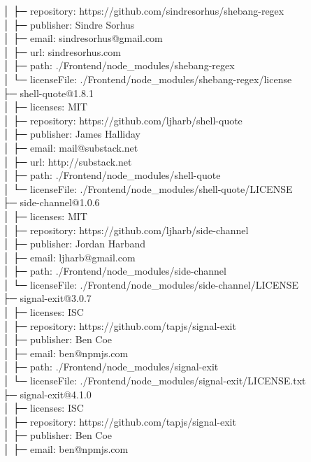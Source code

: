 │  ├─ repository: https://github.com/sindresorhus/shebang-regex\\
│  ├─ publisher: Sindre Sorhus\\
│  ├─ email: sindresorhus@gmail.com\\
│  ├─ url: sindresorhus.com\\
│  ├─ path: ./Frontend/node\_modules/shebang-regex\\
│  └─ licenseFile: ./Frontend/node\_modules/shebang-regex/license\\
├─ shell-quote@1.8.1\\
│  ├─ licenses: MIT\\
│  ├─ repository: https://github.com/ljharb/shell-quote\\
│  ├─ publisher: James Halliday\\
│  ├─ email: mail@substack.net\\
│  ├─ url: http://substack.net\\
│  ├─ path: ./Frontend/node\_modules/shell-quote\\
│  └─ licenseFile: ./Frontend/node\_modules/shell-quote/LICENSE\\
├─ side-channel@1.0.6\\
│  ├─ licenses: MIT\\
│  ├─ repository: https://github.com/ljharb/side-channel\\
│  ├─ publisher: Jordan Harband\\
│  ├─ email: ljharb@gmail.com\\
│  ├─ path: ./Frontend/node\_modules/side-channel\\
│  └─ licenseFile: ./Frontend/node\_modules/side-channel/LICENSE\\
├─ signal-exit@3.0.7\\
│  ├─ licenses: ISC\\
│  ├─ repository: https://github.com/tapjs/signal-exit\\
│  ├─ publisher: Ben Coe\\
│  ├─ email: ben@npmjs.com\\
│  ├─ path: ./Frontend/node\_modules/signal-exit\\
│  └─ licenseFile: ./Frontend/node\_modules/signal-exit/LICENSE.txt\\
├─ signal-exit@4.1.0\\
│  ├─ licenses: ISC\\
│  ├─ repository: https://github.com/tapjs/signal-exit\\
│  ├─ publisher: Ben Coe\\
│  ├─ email: ben@npmjs.com\\
